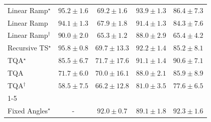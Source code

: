 \begin{tabular}{l|cccc|}
Linear Ramp$^\star$ & {\cellcolor[HTML]{712806}} \color[HTML]{F1F1F1} $95.2\pm 1.6$ & {\cellcolor[HTML]{FEBB47}} \color[HTML]{000000} $69.2\pm 1.6$ & {\cellcolor[HTML]{7C2C05}} \color[HTML]{F1F1F1} $93.9\pm 1.3$ & {\cellcolor[HTML]{C04602}} \color[HTML]{F1F1F1} $86.4\pm 7.3$ \\
Linear Ramp & {\cellcolor[HTML]{7B2B05}} \color[HTML]{F1F1F1} $94.1\pm 1.3$ & {\cellcolor[HTML]{FEC550}} \color[HTML]{000000} $67.9\pm 1.8$ & {\cellcolor[HTML]{933204}} \color[HTML]{F1F1F1} $91.4\pm 1.3$ & {\cellcolor[HTML]{D05104}} \color[HTML]{F1F1F1} $84.3\pm 7.6$ \\
Linear Ramp$^\dagger$ & {\cellcolor[HTML]{A03704}} \color[HTML]{F1F1F1} $90.0\pm 2.0$ & {\cellcolor[HTML]{FED36F}} \color[HTML]{000000} $65.3\pm 1.2$ & {\cellcolor[HTML]{B13F03}} \color[HTML]{F1F1F1} $88.0\pm 2.9$ & {\cellcolor[HTML]{FED26D}} \color[HTML]{000000} $65.4\pm 4.2$ \\
Recursive TS$^\star$ & {\cellcolor[HTML]{6B2606}} \color[HTML]{F1F1F1} $95.8\pm 0.8$ & {\cellcolor[HTML]{FEB744}} \color[HTML]{000000} $69.7\pm 13.3$ & {\cellcolor[HTML]{8C3004}} \color[HTML]{F1F1F1} $92.2\pm 1.4$ & {\cellcolor[HTML]{CB4B02}} \color[HTML]{F1F1F1} $85.2\pm 8.1$ \\
TQA$^\star$ & {\cellcolor[HTML]{C84A02}} \color[HTML]{F1F1F1} $85.5\pm 6.7$ & {\cellcolor[HTML]{FEA937}} \color[HTML]{000000} $71.7\pm 17.6$ & {\cellcolor[HTML]{963304}} \color[HTML]{F1F1F1} $91.1\pm 1.4$ & {\cellcolor[HTML]{9B3504}} \color[HTML]{F1F1F1} $90.6\pm 7.1$ \\
TQA & {\cellcolor[HTML]{FEA937}} \color[HTML]{000000} $71.7\pm 6.0$ & {\cellcolor[HTML]{FEB541}} \color[HTML]{000000} $70.0\pm 16.1$ & {\cellcolor[HTML]{B13F03}} \color[HTML]{F1F1F1} $88.0\pm 2.1$ & {\cellcolor[HTML]{C44802}} \color[HTML]{F1F1F1} $85.9\pm 8.9$ \\
TQA$^\dagger$ & {\cellcolor[HTML]{FFF1AE}} \color[HTML]{000000} $58.5\pm 7.5$ & {\cellcolor[HTML]{FECE65}} \color[HTML]{000000} $66.2\pm 12.8$ & {\cellcolor[HTML]{E3660F}} \color[HTML]{F1F1F1} $81.0\pm 3.5$ & {\cellcolor[HTML]{F27D1B}} \color[HTML]{F1F1F1} $77.6\pm 6.5$ \\
\cline{1-5}
\multicolumn{5}{c}{\rule{0pt}{8pt}PP} \\
\midrule
Fixed Angles$^\star$ & {\cellcolor[HTML]{000000}} \color[HTML]{F1F1F1} {\cellcolor{white}} \color{black} - & {\cellcolor[HTML]{006034}} \color[HTML]{F1F1F1} $92.0\pm 0.7$ & {\cellcolor[HTML]{0A703A}} \color[HTML]{F1F1F1} $89.1\pm 1.8$ & {\cellcolor[HTML]{005E33}} \color[HTML]{F1F1F1} $92.3\pm 1.6$ \\

\end{tabular}
